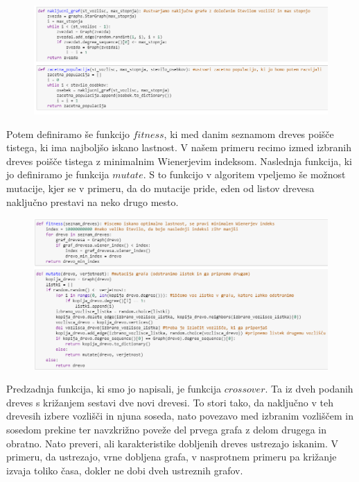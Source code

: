 \documentclass[12pt,a4paper]{amsart}
\theoremstyle{definition} %
\theoremstyle{plain} %
\begin{document}
\begin{figure}[ht]
\centering
\includegraphics[width=1\textwidth]{slika3}
\end{figure}
\pagebreak

Potem definiramo še funkcijo $fitness$, 
ki med danim seznamom dreves poišče tistega, ki ima najboljšo iskano lastnost. V našem primeru recimo
izmed izbranih dreves poišče tistega z minimalnim Wienerjevim indeksom.
Naslednja funkcija, ki jo definiramo je funkcija $mutate$.
S to funkcijo v algoritem vpeljemo še možnost mutacije, kjer se v primeru, da do mutacije pride,
 eden od listov drevesa naključno prestavi na neko drugo mesto.

\begin{figure}[ht]
\centering
\includegraphics[width=1\textwidth]{slika4}
\end{figure}



Predzadnja funkcija, ki smo jo napisali, je funkcija $crossover$. 
Ta iz dveh podanih dreves s križanjem sestavi dve novi drevesi. To stori tako,
da naključno v teh drevesih izbere vozlišči in njuna soseda, nato povezavo med
izbranim vozliščem in sosedom prekine ter navzkrižno poveže del prvega grafa z delom drugega in obratno.
Nato preveri, ali karakteristike dobljenih dreves ustrezajo iskanim. V primeru, da ustrezajo, vrne dobljena grafa, v nasprotnem
primeru pa križanje izvaja toliko časa, dokler ne dobi dveh ustreznih grafov.
\end{document}
